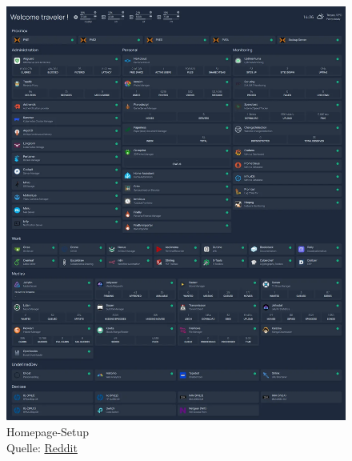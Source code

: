 \documentclass[
    ngerman,
    accentcolor=3b,
    fontsize= 12pt,
    a4paper,
    aspectratio=169,
    colorback=true,
    fancy_row_colors,
    leqno,
    fleqn,
    boxarc=3pt,
    fleqn,
    main,
    design=2008,
]{algoslides}
\begin{document}
\begin{frame}
\begin{columns}[c]
\begin{column}{.5\textwidth}
\begin{figure}[ht!]
                    \includegraphics[height=.5\textheight]{self-hosting.png}
                    \caption{Homepage-Setup\\Quelle: \href{https://www.reddit.com/r/selfhosted/comments/18xgcsu/my_dashboard_now_with_descriptions/}{Reddit}}
                    \label{fig:self-hosting}

                \end{figure}
            \end{column}%
        \end{columns}
    \end{frame}
\end{document}
